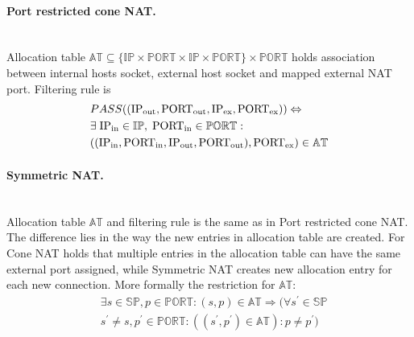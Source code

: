 \documentclass[twoside]{article}
\begin{document}
\begin{multicols}{2}
\paragraph{Port restricted cone NAT.} ~\\
Allocation table $\mathbb{AT} \subseteq \{\mathbb{IP} \times \mathbb{PORT} \times \mathbb{IP} \times \mathbb{PORT}\} \times \mathbb{PORT}$ 
holds association between internal hosts socket, external host socket and mapped external NAT port. 
Filtering rule is
\begin{align*}
& PASS((\text{IP\textsubscript{out}}, \text{PORT\textsubscript{out}}, \text{IP\textsubscript{ex}}, \text{PORT\textsubscript{ex}} )) \Leftrightarrow \\
&  \exists \; \text{IP\textsubscript{in}} \in \mathbb{IP}, \; \text{PORT\textsubscript{in}} \in \mathbb{PORT}:\\
& ((\text{IP\textsubscript{in}}, \text{PORT\textsubscript{in}}, \text{IP\textsubscript{out}}, \text{PORT\textsubscript{out}}), \text{PORT\textsubscript{ex}} ) \in \mathbb{AT}
\end{align*}

\paragraph{Symmetric NAT.} ~\\
Allocation table $\mathbb{AT}$ and filtering rule is the same as in Port restricted cone NAT. The difference lies in the way 
the new entries in allocation table are created. For Cone NAT holds that multiple entries in the allocation table 
can have the same external port assigned, while Symmetric NAT creates new allocation entry for each new connection. 
More formally the restriction for $\mathbb{AT}$: 
\begin{align*}
& \exists s \in \mathbb{SP}, p \in \mathbb{PORT}: (s, p) \in \mathbb{AT} \Rightarrow (\forall s^{\prime} \in \mathbb{SP} \\
& s^{\prime} \neq s , p^{\prime} \in \mathbb{PORT}: ((s^{\prime}, p^{\prime}) \in \mathbb{AT}): p \neq p^{\prime})
\end{align*}
% 



\end{multicols}
\end{document}
